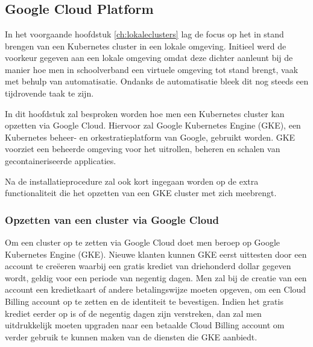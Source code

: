 
\chapter{}
\label{ch:cloudclusters}

\section{Google Cloud Platform}

In het voorgaande hoofdstuk \ref{ch:lokaleclusters} lag de focus op het in stand brengen van een Kubernetes cluster in een lokale omgeving. Initieel werd de voorkeur gegeven aan een lokale omgeving omdat deze dichter aanleunt bij de manier hoe men in schoolverband een virtuele omgeving tot stand brengt, vaak met behulp van automatisatie. Ondanks de automatisatie bleek dit nog steeds een tijdrovende taak te zijn. 

In dit hoofdstuk zal besproken worden hoe men een Kubernetes cluster kan opzetten via Google Cloud. Hiervoor zal Google Kubernetes Engine (GKE), een Kubernetes beheer- en orkestratieplatform van Google, gebruikt worden. GKE voorziet een beheerde omgeving voor het uitrollen, beheren en schalen van gecontaineriseerde applicaties.

Na de installatieprocedure zal ook kort ingegaan worden op de extra functionaliteit die het opzetten van een GKE cluster met zich meebrengt. 

\subsection{Opzetten van een cluster via Google Cloud}
\label{sec:cloudclustersetup}

Om een cluster op te zetten via Google Cloud doet men beroep op Google Kubernetes Engine (GKE). Nieuwe klanten kunnen GKE eerst uittesten door een account te creëeren waarbij een gratis krediet van driehonderd dollar gegeven wordt, geldig voor een periode van negentig dagen. Men zal bij de creatie van een account een kredietkaart of andere betalingswijze moeten opgeven, om een Cloud Billing account op te zetten en de identiteit te bevestigen. Indien het gratis krediet eerder op is of de negentig dagen zijn verstreken, dan zal men uitdrukkelijk moeten upgraden naar een betaalde Cloud Billing account om verder gebruik te kunnen maken van de diensten die GKE aanbiedt. \autocite{GoogleCloud2022} 

